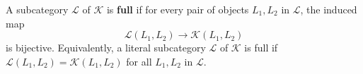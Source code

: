 A subcategory $\mathcal{L}$ of $\mathcal{K}$ is \textbf{full} if for every pair of objects $L_1, L_2$ in $\mathcal{L}$, the induced map
$$
\mathcal{L}(L_1, L_2) \longrightarrow \mathcal{K}(L_1, L_2)
$$
is bijective. Equivalently, a literal subcategory $\mathcal{L}$ of $\mathcal{K}$ is full if $\mathcal{L}(L_1, L_2) = \mathcal{K}(L_1, L_2)$ for all $L_1, L_2$ in $\mathcal{L}$.
